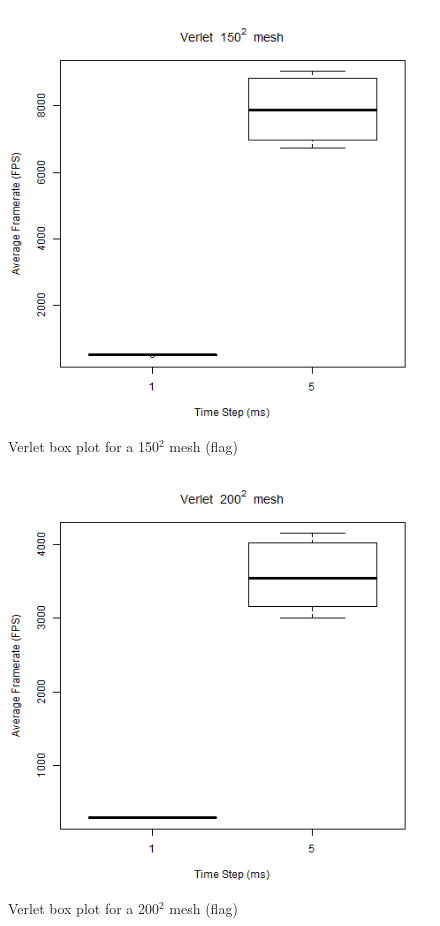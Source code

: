       \begin{figure}
    \begin{center}
      \includegraphics[scale=.9]{Figures/flag_v_150_box}
    \end{center}
    \caption{Verlet box plot for a 150$^{2}$ mesh (flag)}
    \label{fig:v box 150 flag}
  \end{figure}
  
      \begin{figure}
    \begin{center}
      \includegraphics[scale=.9]{Figures/flag_v_200_box}
    \end{center}
    \caption{Verlet box plot for a 200$^{2}$ mesh (flag)}
    \label{fig:v box 200 flag}
  \end{figure}
  
